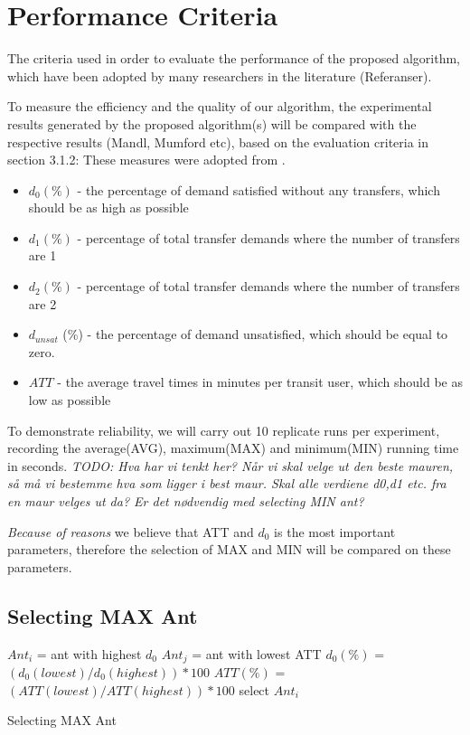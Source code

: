 \section{Performance Criteria}


The criteria used in order to evaluate the performance of the proposed algorithm, which have been adopted by many researchers in the literature (Referanser).

To measure the efficiency and the quality of our algorithm, the experimental results generated by the proposed algorithm(s) will be compared with the respective results (Mandl, Mumford etc), based on the evaluation criteria in section 3.1.2: 
These measures were adopted from \citet{kechagiopoulos14}.

\begin{itemize}
\item $d_0 (\%)$ - the percentage of demand satisfied without any transfers, which should be as high as possible
\item $d_1 (\%)$ - percentage of total transfer demands where the number of transfers are 1
\item $d_2 (\%)$ - percentage of total transfer demands where the number of transfers are 2
\item $d_{unsat}$ (\%) - the percentage of demand unsatisfied, which should be equal to zero.
\item $ATT$  - the average travel times in minutes per transit user, which should be as low as possible
\end{itemize}

To demonstrate reliability, we will carry out 10 replicate runs per experiment, recording the average(AVG), maximum(MAX) and minimum(MIN) running time in seconds.  
\emph{\color{red} TODO: Hva har vi tenkt her? Når vi skal velge ut den beste mauren, så må vi bestemme hva som ligger i best maur. Skal alle verdiene d0,d1 etc. fra en maur velges ut da?  Er det nødvendig med selecting MIN ant?}

\emph{\color{red} Because of reasons }we believe that ATT and $d_0$ is the most important parameters, therefore the selection of MAX and MIN will be compared on these parameters.

\subsection{Selecting MAX Ant}

\begin{algorithm}[H]
$Ant_{i}$ = ant with highest $d_0$\;
$Ant_{j}$ = ant with lowest ATT\;
{
	$d_0(\%)$ = $(d_0(lowest) / d_0(highest))*100$\;
	$ATT(\%)$ = $(ATT(lowest) / ATT(highest))*100$\;
	{
		select $Ant_{i}$
	}
}
 \caption{Selecting MAX Ant}
\end{algorithm}

